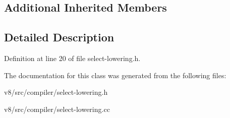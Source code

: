 \subsection*{Additional Inherited Members}


\subsection{Detailed Description}


Definition at line 20 of file select-\/lowering.\+h.



The documentation for this class was generated from the following files\+:\begin{DoxyCompactItemize}
\item 
v8/src/compiler/select-\/lowering.\+h\item 
v8/src/compiler/select-\/lowering.\+cc\end{DoxyCompactItemize}
